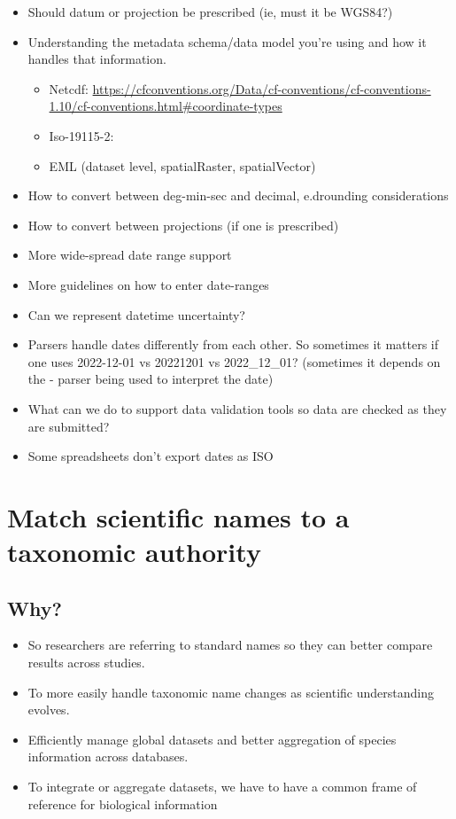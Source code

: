 \documentclass[
  oneside]{book}
\providecommand{\tightlist}{%
  \setlength{\itemsep}{0pt}\setlength{\parskip}{0pt}}
\begin{document}
\begin{itemize}
\tightlist
\item
  Should datum or projection be prescribed (ie, must it be WGS84?)
\item
  Understanding the metadata schema/data model you're using and how it handles that information.

  \begin{itemize}
  \tightlist
  \item
    Netcdf: \url{https://cfconventions.org/Data/cf-conventions/cf-conventions-1.10/cf-conventions.html\#coordinate-types}
  \item
    Iso-19115-2:
  \item
    EML (dataset level, spatialRaster, spatialVector)
  \end{itemize}
\item
  How to convert between deg-min-sec and decimal, e.drounding considerations
\item
  How to convert between projections (if one is prescribed)
\item
  More wide-spread date range support
\item
  More guidelines on how to enter date-ranges
\item
  Can we represent datetime uncertainty?
\item
  Parsers handle dates differently from each other. So sometimes it matters if one uses 2022-12-01 vs 20221201 vs 2022\_12\_01? (sometimes it depends on the - parser being used to interpret the date)
\item
  What can we do to support data validation tools so data are checked as they are submitted?
\item
  Some spreadsheets don't export dates as ISO
\end{itemize}

\hypertarget{match-scientific-names-to-a-taxonomic-authority}{%
\section{Match scientific names to a taxonomic authority}\label{match-scientific-names-to-a-taxonomic-authority}}

\hypertarget{why-3}{%
\subsection{Why?}\label{why-3}}

\begin{itemize}
\tightlist
\item
  So researchers are referring to standard names so they can better compare results across studies.
\item
  To more easily handle taxonomic name changes as scientific understanding evolves.
\item
  Efficiently manage global datasets and better aggregation of species information across databases.
\item
  To integrate or aggregate datasets, we have to have a common frame of reference for biological information
\end{itemize}
\end{document}
